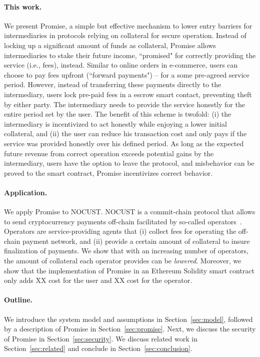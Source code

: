 \documentclass[runningheads]{llncs}
\newcommand{\sys}{Promise\xspace}
\begin{document}
\paragraph{This work.}
We present \sys, a simple but effective mechanism to lower entry barriers for intermediaries in protocols relying on collateral for secure operation.
Instead of locking up a significant amount of funds as collateral, \sys allows intermediaries to stake their future income, ``promised" for correctly providing the service (i.e., fees), instead.
Similar to online orders in e-commerce, users can choose to pay fees upfront (``forward payments") -- for a some pre-agreed service period.
However, instead of transferring these payments directly to the intermediary, users lock pre-paid fees in a escrow smart contact, preventing theft by either party. 
The intermediary needs to provide the service honestly for the entire period set by the user.
The benefit of this scheme is twofold: (i) the intermediary is incentivized to act honestly while enjoying a lower initial collateral, and (ii) the user can reduce his transaction cost and only pays if the service was provided honestly over his defined period. %
As long as the expected future revenue from correct operation exceeds potential gains by the intermediary, users have the option to leave the protocol, and misbehavior can be proved to the smart contract, \sys incentivizes correct behavior.

\paragraph{Application.}
We apply \sys to NOCUST.
NOCUST is a commit-chain protocol that allows to send cryptocurrency payments off-chain facilitated by so-called operators~\cite{Khalil2019NOCUST}.
Operators are service-providing agents that (i) collect fees for operating the off-chain payment network, and (ii) provide a certain amount of collateral to insure finalization of payments.
We show that with an increasing number of operators, the amount of collateral each operator provides can be \emph{lowered}.
Moreover, we show that the implementation of \sys in an Ethereum Solidity smart contract only adds XX cost for the user and XX cost for the operator.

\paragraph{Outline.}
We introduce the system model and assumptions in Section~\ref{sec:model}, followed by a description of \sys in Section~\ref{sec:promise}.
Next, we discuss the security of \sys in Section~\ref{sec:security}. %
We discuss related work in Section~\ref{sec:related} and conclude in Section~\ref{sec:conclusion}.
\end{document}
